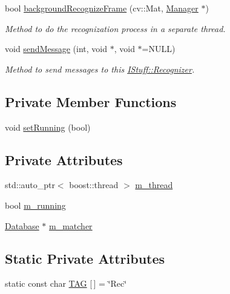 \begin{DoxyCompactItemize}
bool \hyperlink{class_i_stuff_1_1_recognizer_ad4e54485be9385a287bc51670247b0cc}{background\-Recognize\-Frame} (cv\-::\-Mat, \hyperlink{class_i_stuff_1_1_manager}{Manager} $\ast$)
\begin{DoxyCompactList}\small\item\em Method to do the recognization process in a separate thread. \end{DoxyCompactList}\item 
void \hyperlink{class_i_stuff_1_1_recognizer_a1bb1a4e7045eb4d84d84dac439e9c762}{send\-Message} (int, void $\ast$, void $\ast$=N\-U\-L\-L)
\begin{DoxyCompactList}\small\item\em Method to send messages to this \hyperlink{class_i_stuff_1_1_recognizer}{I\-Stuff\-::\-Recognizer}. \end{DoxyCompactList}\end{DoxyCompactItemize}
\subsection*{Private Member Functions}
\begin{DoxyCompactItemize}
\item 
void \hyperlink{class_i_stuff_1_1_recognizer_a695bcf5d468066b63624c800603bf44b}{set\-Running} (bool)
\end{DoxyCompactItemize}
\subsection*{Private Attributes}
\begin{DoxyCompactItemize}
\item 
std\-::auto\-\_\-ptr$<$ boost\-::thread $>$ \hyperlink{class_i_stuff_1_1_recognizer_a54706a2dbb34a1532fcf4445ef3db5ae}{m\-\_\-thread}
\item 
bool \hyperlink{class_i_stuff_1_1_recognizer_a7bee1b5ec6e924d687d354ba7d780d7e}{m\-\_\-running}
\item 
\hyperlink{class_i_stuff_1_1_database}{Database} $\ast$ \hyperlink{class_i_stuff_1_1_recognizer_aee653ffc737e5b18181f785f655ed421}{m\-\_\-matcher}
\end{DoxyCompactItemize}
\subsection*{Static Private Attributes}
\begin{DoxyCompactItemize}
\item 
static const char \hyperlink{class_i_stuff_1_1_recognizer_a90ec5deceaef320be5e825f653dcf7f1}{T\-A\-G} \mbox{[}$\,$\mbox{]} = \char`\"{}Rec\char`\"{}
\end{DoxyCompactItemize}


